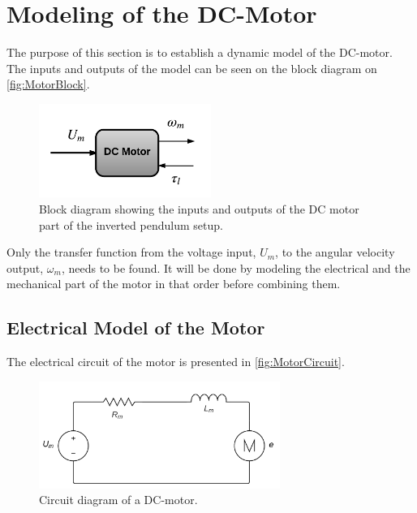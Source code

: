 \section{Modeling of the DC-Motor}
The purpose of this section is to establish a dynamic model of the DC-motor. The inputs and outputs of the model can be seen on the block diagram on \autoref{fig:MotorBlock}.
\begin{figure}[htbp]
\centering
\includegraphics[width=0.5\textwidth]{figures/modeling/Motor/InputOutputMotor.pdf}
\caption{Block diagram showing the inputs and outputs of the DC motor part of the inverted pendulum setup.}
\label{fig:MotorBlock}
\end{figure}

Only the transfer function from the voltage input, $U_m$, to the angular velocity output, $\omega_m$, needs to be found. It will be done by modeling the electrical and the mechanical part of the motor in that order before combining them.

\subsection{Electrical Model of the Motor}
The electrical circuit of the motor is presented in \autoref{fig:MotorCircuit}.
\begin{figure}[htbp]
	\centering
 	\includegraphics[width=0.7\textwidth]{figures/modeling/Motor/MotorElectricCircuit.pdf} 
 	\caption{Circuit diagram of a DC-motor.}
 	\label{fig:MotorCircuit}
\end{figure}

